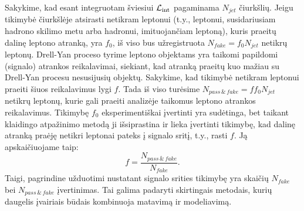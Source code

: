 \documentclass[a4paper, 12pt, oneside]{article}
\newcommand{\Lumi}{{\cal L}_\mathrm{int}}
\newlength\q
\begin{document}
Sakykime, kad esant integruotam šviesiui $\Lumi$ pagaminama $N_{jet}$ čiurkšlių.
Jeigu tikimybė čiurkšlėje atsirasti netikram leptonui (t.y., leptonui, susidariusiam hadrono skilimo metu arba hadronui, imituojančiam
leptoną), kuris praeitų dalinę leptono atranką, yra $f_0$, iš viso bus užregistruota $N_{fake}=f_0 N_{jet}$ netikrų leptonų.
Drell-Yan proceso tyrime leptono objektams yra taikomi papildomi (signalo) atrankos reikalavimai, siekiant, kad atranką praeitų kuo
mažiau su Drell-Yan procesu nesusijusių objektų.
Sakykime, kad tikimybė netikram leptonui praeiti šiuos reikalavimus lygi $f$.
Tada iš viso turėsime $N_{pass \,\&\, fake}=ff_0 N_{jet}$ netikrų leptonų, kurie gali praeiti analizėje taikomus leptono
atrankos reikalavimus.
Tikimybę $f_0$ eksperimentiškai įvertinti yra sudėtinga, bet taikant klaidingo atpažinimo metodą ji išsiprastina ir lieka
įvertinti tikimybę, kad dalinę atranką praėję netikri leptonai pateks į signalo sritį, t.y., rasti $f$.
Ją apskaičiuojame taip:
\begin{equation}
\label{eq:FRtheor}
	f = \frac{N_{pass \,\&\, fake}}{N_{fake}} .
\end{equation}
Taigi, pagrindine užduotimi nustatant signalo srities tikimybę yra skaičių $N_{fake}$ bei $N_{pass \,\&\, fake}$ įvertinimas.
Tai galima padaryti skirtingais metodais, kurių daugelis įvairiais būdais kombinuoja matavimą ir modeliavimą.
\end{document}
